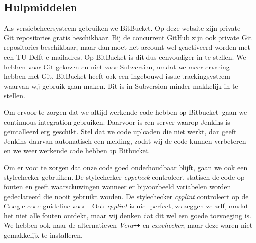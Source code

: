 \subsection{Hulpmiddelen}
Als versiebeheersysteem gebruiken we BitBucket. Op deze website zijn private Git repositories gratis beschikbaar. Bij de concurrent GitHub zijn ook private Git repositories beschikbaar, maar dan moet het account wel geactiveerd worden met een TU Delft e-mailadres. Op BitBucket is dit dus eenvoudiger in te stellen. We hebben voor Git gekozen en niet voor Subversion, omdat we meer ervaring hebben met Git. BitBucket heeft ook een ingebouwd issue-trackingsysteem waarvan wij gebruik gaan maken. Dit is in Subversion minder makkelijk in te stellen.

Om ervoor te zorgen dat we altijd werkende code hebben op Bitbucket, gaan we continuous integration gebruiken. Daarvoor is een server waarop Jenkins is ge\"intalleerd erg geschikt. Stel dat we code uploaden die niet werkt, dan geeft Jenkins daarvan automatisch een melding, zodat wij de code kunnen verbeteren en we weer werkende code hebben op Bitbucket.  

Om er voor te zorgen dat onze code goed onderhoudbaar blijft, gaan we ook een stylechecker gebruiken. De stylechecker \emph{cppcheck} controleert statisch de code op fouten en geeft waarschuwingen wanneer er bijvoorbeeld variabelen worden gedeclareerd die nooit gebruikt worden. De stylechecker \emph{cpplint} controleert op de Google code guideline voor \cpp. Ook \emph{cpplint} is niet perfect, zo zeggen ze zelf, omdat het niet alle fouten ontdekt, maar wij denken dat dit wel een goede toevoeging is. We hebben ook naar de alternatieven \emph{Vera\texttt{++}} en \emph{cxxchecker}, maar deze waren niet gemakkelijk te installeren.
